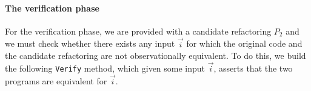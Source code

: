 \documentclass[sigconf,review,anonymous]{acmart}
\begin{document}





\paragraph{The verification phase} For the verification phase, we are provided with a candidate
refactoring $P_2$ and we must check whether there exists any input
$\vec{i}$ for which the original code and the candidate
refactoring are not observationally equivalent.  To do this, we build
the following \texttt{Verify} method, which given some input
$\vec{i}$, asserts that the two programs are equivalent for
$\vec{i}$.
\end{document}
